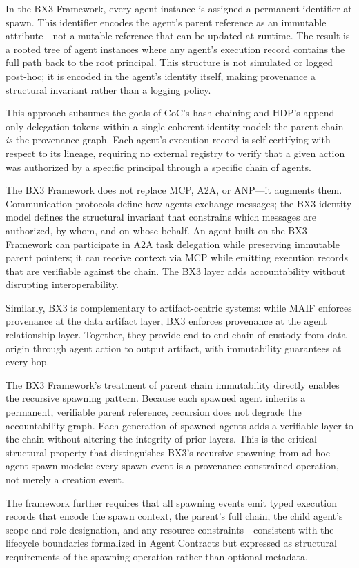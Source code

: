 In the BX3 Framework, every agent instance is assigned a permanent identifier at spawn. This identifier encodes the agent's parent reference as an immutable attribute---not a mutable reference that can be updated at runtime. The result is a rooted tree of agent instances where any agent's execution record contains the full path back to the root principal. This structure is not simulated or logged post-hoc; it is encoded in the agent's identity itself, making provenance a structural invariant rather than a logging policy.

This approach subsumes the goals of CoC's hash chaining and HDP's append-only delegation tokens within a single coherent identity model: the parent chain \textit{is} the provenance graph. Each agent's execution record is self-certifying with respect to its lineage, requiring no external registry to verify that a given action was authorized by a specific principal through a specific chain of agents.

The BX3 Framework does not replace MCP, A2A, or ANP---it augments them. Communication protocols define how agents exchange messages; the BX3 identity model defines the structural invariant that constrains which messages are authorized, by whom, and on whose behalf. An agent built on the BX3 Framework can participate in A2A task delegation while preserving immutable parent pointers; it can receive context via MCP while emitting execution records that are verifiable against the chain. The BX3 layer adds accountability without disrupting interoperability.

Similarly, BX3 is complementary to artifact-centric systems: while MAIF enforces provenance at the data artifact layer, BX3 enforces provenance at the agent relationship layer. Together, they provide end-to-end chain-of-custody from data origin through agent action to output artifact, with immutability guarantees at every hop.

The BX3 Framework's treatment of parent chain immutability directly enables the recursive spawning pattern. Because each spawned agent inherits a permanent, verifiable parent reference, recursion does not degrade the accountability graph. Each generation of spawned agents adds a verifiable layer to the chain without altering the integrity of prior layers. This is the critical structural property that distinguishes BX3's recursive spawning from ad hoc agent spawn models: every spawn event is a provenance-constrained operation, not merely a creation event.

The framework further requires that all spawning events emit typed execution records that encode the spawn context, the parent's full chain, the child agent's scope and role designation, and any resource constraints---consistent with the lifecycle boundaries formalized in Agent Contracts \cite{agentcontracts2025} but expressed as structural requirements of the spawning operation rather than optional metadata.

